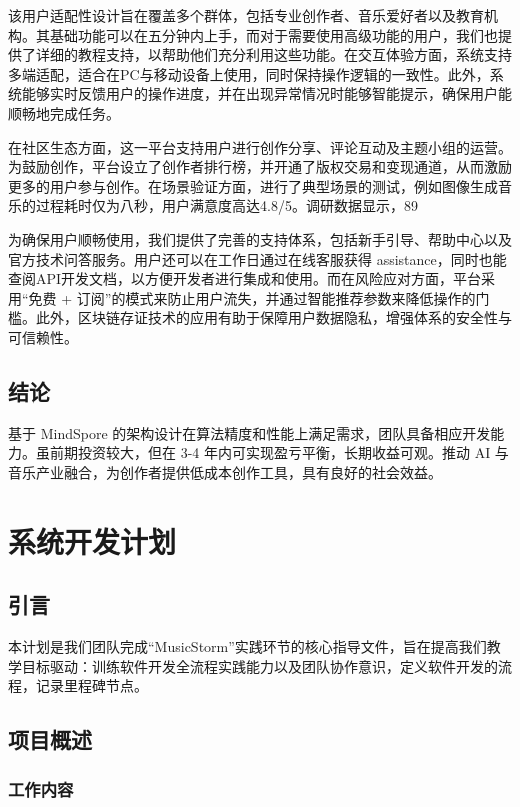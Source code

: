 \documentclass{base}
\begin{document}
该用户适配性设计旨在覆盖多个群体，包括专业创作者、音乐爱好者以及教育机构。其基础功能可以在五分钟内上手，而对于需要使用高级功能的用户，我们也提供了详细的教程支持，以帮助他们充分利用这些功能。在交互体验方面，系统支持多端适配，适合在PC与移动设备上使用，同时保持操作逻辑的一致性。此外，系统能够实时反馈用户的操作进度，并在出现异常情况时能够智能提示，确保用户能顺畅地完成任务。

在社区生态方面，这一平台支持用户进行创作分享、评论互动及主题小组的运营。为鼓励创作，平台设立了创作者排行榜，并开通了版权交易和变现通道，从而激励更多的用户参与创作。在场景验证方面，进行了典型场景的测试，例如图像生成音乐的过程耗时仅为八秒，用户满意度高达4.8/5。调研数据显示，89%

为确保用户顺畅使用，我们提供了完善的支持体系，包括新手引导、帮助中心以及官方技术问答服务。用户还可以在工作日通过在线客服获得 assistance，同时也能查阅API开发文档，以方便开发者进行集成和使用。而在风险应对方面，平台采用“免费 + 订阅”的模式来防止用户流失，并通过智能推荐参数来降低操作的门槛。此外，区块链存证技术的应用有助于保障用户数据隐私，增强体系的安全性与可信赖性。

\subsection{结论}

基于 MindSpore 的架构设计在算法精度和性能上满足需求，团队具备相应开发能力。虽前期投资较大，但在 3-4 年内可实现盈亏平衡，长期收益可观。推动 AI 与音乐产业融合，为创作者提供低成本创作工具，具有良好的社会效益。 

\section{系统开发计划}

\subsection{引言}

本计划是我们团队完成“MusicStorm”实践环节的核心指导文件，旨在提高我们教学目标驱动：训练软件开发全流程实践能力以及团队协作意识​，定义软件开发的流程，记录里程碑节点。

\subsection{项目概述}

\subsubsection{工作内容}
\end{document}
